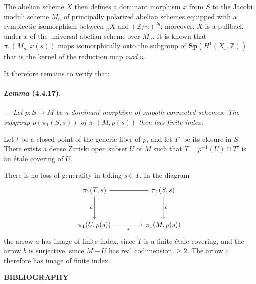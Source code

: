 \documentclass[10pt]{article}
\newcommand{\Z}{\mathbb Z}
\newcommand{\fg}{\guillemotright}
\newcommand{\og}{\guillemotleft}
\begin{document}
The abelian scheme $X$ then defines a dominant morphism $x$ from $S$ to the \og Jacobi\fg{} moduli scheme $M_n$ of principally polarized abelian schemes equipped with a symplectic isomorphism between ${}_nX$ and $(\Z/n)^{2g}$; moreover, $X$ is a pullback under $x$ of the universal abelian scheme over $M_n$. It is known that $\pi_1(M_n,x(s))$ maps isomorphically
onto the subgroup of $\mathbf{Sp}(H^1(X_s,\Z))$ that is the kernel of the reduction map \textit{mod} $n$.

It therefore remains to verify that:

\paragraph{\emph{Lemma} (4.4.17).} --- {\itshape Let $p:S\to M$ be a dominant morphism of smooth connected schemes. The subgroup $p(\pi_1(S,s))$ of $\pi_1(M,p(s))$ then has finite index.}

Let $t$ be a closed point of the generic fiber of $p$, and let $T'$ be its closure in $S$. There exists a dense Zariski open subset $U$ of $M$ such that $T=p^{-1}(U)\cap T'$ is an étale covering of $U$.

There is no loss of generality in taking $s\in T$. In the diagram
\[
\begin{tikzcd}[column sep=4.2em,row sep=3.2em]
\pi_1(T,s) \arrow[r] \arrow[d,"a"'] & \pi_1(S,s) \arrow[d,"c"]\\
\pi_1(U,p(s)) \arrow[r,"b"'] & \pi_1(M,p(s))
\end{tikzcd}
\]
the arrow $a$ has image of finite index, since $T$ is a finite étale covering, and the arrow $b$ is surjective, since $M-U$ has real codimension $\ge2$. The arrow $c$ therefore has image of finite index.

\begin{center}
\bfseries BIBLIOGRAPHY
\end{center}
\end{document}
